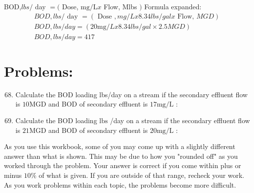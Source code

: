 \begin{enumerate}
BOD,$l b s /$ day $=($ Dose, $\mathrm{mg} / \mathrm{L} x$ Flow, Mlbs $)$ Formula expanded:
$$
\begin{gathered}
B O D, l b s / \text { day }=(\text { Dose }, m g / L x 8.34 l b s / g a l x \text { Flow, } M G D) \\
B O D, l b s / d a y=(20 \mathrm{mg} / L x 8.34 l b s / g a l \times 2.5 M G D) \\
B O D, l b s / d a y=417
\end{gathered}
$$

\section{Problems:}
\begin{enumerate}
  \setcounter{enumi}{67}
  \item Calculate the BOD loading lbs/day on a stream if the secondary effluent flow is $10 \mathrm{MGD}$ and BOD of secondary effluent is $17 \mathrm{mg} / \mathrm{L}$ :

  \item Calculate the BOD loading $\mathrm{lbs}$ /day on a stream if the secondary effluent flow is $21 \mathrm{MGD}$ and BOD of secondary effluent is $20 \mathrm{mg} / \mathrm{L}$ :

\end{enumerate}















































As you use this workbook, some of you may come up with a slightly different answer than what is shown. This may be due to how you "rounded off" as you worked through the problem. Your answer is correct if you come within plus or minus $10 \%$ of what is given. If you are outside of that range, recheck your work. As you work problems within each topic, the problems become more difficult.


\end{enumerate}
